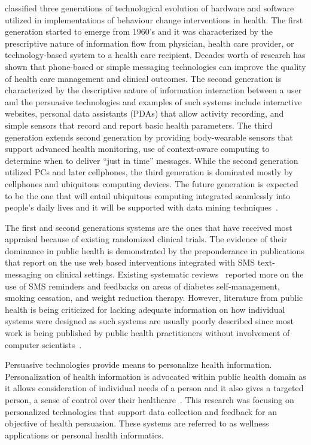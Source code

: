 \cite{chatterjee2009healthy} classified three generations  of technological evolution of hardware and software utilized in implementations of behaviour change interventions in health. The first generation started to emerge from 1960's and it was characterized by the prescriptive nature of information flow from physician, health care provider, or technology-based system to a health care recipient. Decades worth of research has shown that phone-based or simple messaging technologies can improve the quality of health care management and clinical outcomes. The second generation is characterized by the descriptive nature of information interaction between a user and the persuasive technologies and examples of such systems include interactive websites, personal data assistants (PDAs) that allow activity recording, and simple sensors that record and report basic health parameters. The third generation extends second generation by providing body-wearable sensors that support advanced health monitoring, use of context-aware computing to determine when to deliver “just in time” messages.  While the second generation utilized PCs and later cellphones, the third generation is dominated mostly by cellphones and ubiquitous computing devices. The future generation is expected to be the one that will entail ubiquitous computing integrated seamlessly into people's daily lives and it will be supported with data mining techniques~\citep{chatterjee2009healthy}.

The first and second generations systems are the ones that have received most appraisal because of existing randomized clinical trials. The evidence of their dominance in public health is demonstrated by the preponderance in publications that report on the use web based interventions integrated with SMS text-messaging on clinical settings. Existing systematic reviews~\citep{cole2010text,fjeldsoe2009behavior,krishna2009healthcare} reported more on the use of SMS reminders and feedbacks on areas of diabetes self-management, smoking cessation, and weight reduction therapy. However, literature from public health is being criticized for lacking adequate information on how individual systems were designed as such systems are usually poorly described since most work is being published by public health practitioners without involvement of computer scientists~\citep{Oinas-Kukkonen:foundation}.

Persuasive technologies provide means to personalize health information. Personalization of health information is advocated within public health domain as it allows consideration of individual needs of a person and it also gives a targeted person, a  sense of control over their healthcare~\citep{mccallum2012gamification}. This research was focusing on personalized technologies that support data collection and feedback for an objective of health persuasion. These systems are referred to as wellness applications or personal health informatics. 
